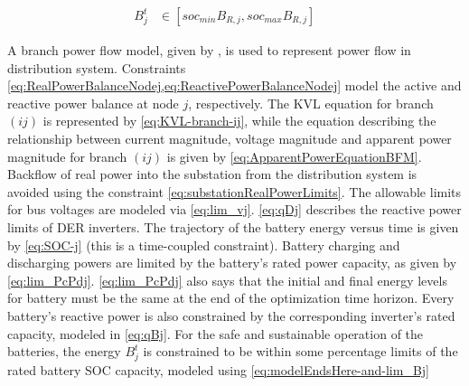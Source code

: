 \documentclass[../../outputs/main.tex]{subfiles}
\begin{document}
\vspace{-1.5em} %

\begin{align}
    { B^{t}_{j} } &\in { \left[ soc_{min}B_{R, j}, soc_{max}B_{R, j} \right] } \label{eq:modelEndsHere-and-lim_Bj} &&
\end{align}

A branch power flow model, given by , is used to represent power flow in distribution system.   Constraints \cref{eq:RealPowerBalanceNodej,eq:ReactivePowerBalanceNodej} model the active and reactive power balance at node $j$, respectively.
The KVL equation for branch $(ij)$ is represented by \cref{eq:KVL-branch-ij}, while the equation describing the relationship between current magnitude, voltage magnitude and apparent power magnitude for branch $(ij)$ is given by \cref{eq:ApparentPowerEquationBFM}. Backflow of real power into the substation from the distribution system is avoided using the constraint \cref{eq:substationRealPowerLimits}. The allowable limits for bus voltages are modeled via \cref{eq:lim_vj}. \cref{eq:qDj} describes the reactive power limits of DER inverters. The trajectory of the battery energy versus time is given by \cref{eq:SOC-j} (this is a time-coupled constraint). Battery charging and discharging powers are limited by the battery's rated power capacity, as given by \cref{eq:lim_PcPdj}. \cref{eq:lim_PcPdj} also says that the initial and final energy levels for battery must be the same at the end of the optimization time horizon. Every battery's reactive power is also constrained by the corresponding inverter's rated capacity, modeled in \cref{eq:qBj}. For the safe and sustainable operation of the batteries, the energy $B^{t}_{j}$ is constrained to be within some percentage limits of the rated battery SOC capacity, modeled using \cref{eq:modelEndsHere-and-lim_Bj}

\end{document}
